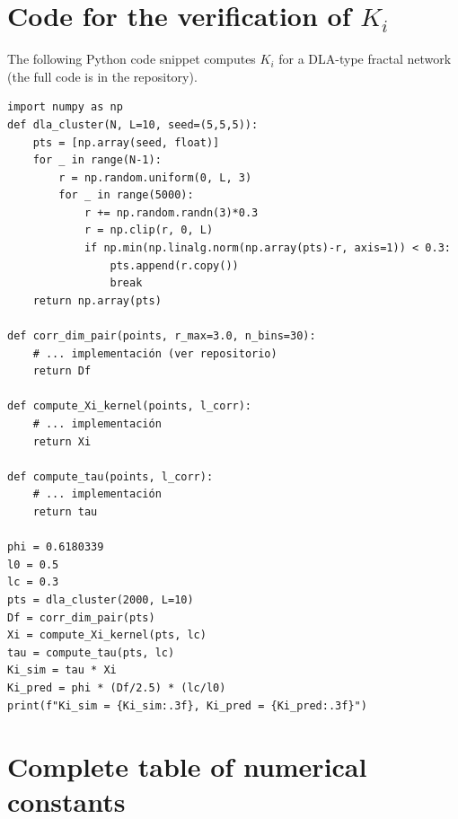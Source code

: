 \documentclass[12pt, a4paper]{article}
\theoremstyle{miuThm}
\theoremstyle{remark}
\begin{document}
\clearpage
\section{Code for the verification of $K_i$}
\label{app:codigo_Ki}

The following Python code snippet computes $K_i$ for a DLA-type fractal network (the full code is in the repository).

\begin{verbatim}
import numpy as np
def dla_cluster(N, L=10, seed=(5,5,5)):
    pts = [np.array(seed, float)]
    for _ in range(N-1):
        r = np.random.uniform(0, L, 3)
        for _ in range(5000):
            r += np.random.randn(3)*0.3
            r = np.clip(r, 0, L)
            if np.min(np.linalg.norm(np.array(pts)-r, axis=1)) < 0.3:
                pts.append(r.copy())
                break
    return np.array(pts)

def corr_dim_pair(points, r_max=3.0, n_bins=30):
    # ... implementación (ver repositorio)
    return Df

def compute_Xi_kernel(points, l_corr):
    # ... implementación
    return Xi

def compute_tau(points, l_corr):
    # ... implementación
    return tau

phi = 0.6180339
l0 = 0.5
lc = 0.3
pts = dla_cluster(2000, L=10)
Df = corr_dim_pair(pts)
Xi = compute_Xi_kernel(pts, lc)
tau = compute_tau(pts, lc)
Ki_sim = tau * Xi
Ki_pred = phi * (Df/2.5) * (lc/l0)
print(f"Ki_sim = {Ki_sim:.3f}, Ki_pred = {Ki_pred:.3f}")
\end{verbatim}


\clearpage
\section{Complete table of numerical constants}
\label{app:constantes}
\end{document}
